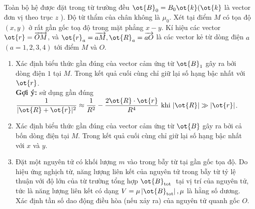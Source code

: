 \begin{vd}
\begin{center}
\end{center}
Toàn bộ hệ được đặt trong từ trường đều $\ot{B}_{0}=B_{0} \ot{k} (\ot{k}$ là vector đơn vị theo trục $z$ ). Độ từ thẩm của chân không là $\mu_{0}.$ Xét tại điểm ${M}$ có tọa độ $(x, y)$ ở rất gần gốc toạ độ trong mặt phẳng $x-y$. Kí hiệu các vector $\ot{r}=\overrightarrow{{OM}}$, và $\ot{r}_{a}=\overrightarrow{{aM}}, \ot{R}_{a}=\overrightarrow{{aO}}$ là các
vector kẻ từ dòng điện $a$ $({a}=1,2,3,4)$ tới điểm ${M}$ và ${O}$.
\begin{enumerate}[1)]
\item Xác định biểu thức gần đúng của vector cảm ứng từ $\ot{B}_{1}$ gây ra bởi dòng điện $1$ tại ${M}$. Trong kết quả cuối cùng chỉ giữ lại số hạng bậc nhất với $\ot{r}$.\\
\textbf{Gợi ý:} sử dụng gần đúng $\dfrac{1}{|\ot{R}+\ot{r}|^{2}} \approx \dfrac{1}{R^{2}}-\dfrac{2 \ot{R} \cdot \ot{r}}{R^{4}} \text{ khi }|\ot{R}| \gg|\ot{r}|$.
\item  Xác định biểu thức gần đúng của vector cảm ứng từ $\ot{B}$ gây ra bởi cả bốn dòng điện tại ${M}$. Trong kết quả cuối cùng chỉ giữ lại số hạng bậc nhất với $x$ và $y$.
\item  Đặt một nguyên tử có khối lượng $m$ vào trong bẫy từ tại gần gốc tọa độ. Do hiệu ứng nghịch từ, năng lượng liên kết của nguyên tử trong bẫy từ tỷ lệ thuận với độ lớn của từ trường tổng hợp $\ot{B}_{\text {tot }}$ tại vị trí của nguyên tử, tức là năng lượng liên kết có dạng $V=\mu\left|\ot{B}_{\text {tot}}\right|, \mu$ là hằng số dương. Xác định tần số dao động điều hòa (nếu xảy ra) của nguyên tử quanh gốc ${O}$.
\end{enumerate}

\end{vd}
